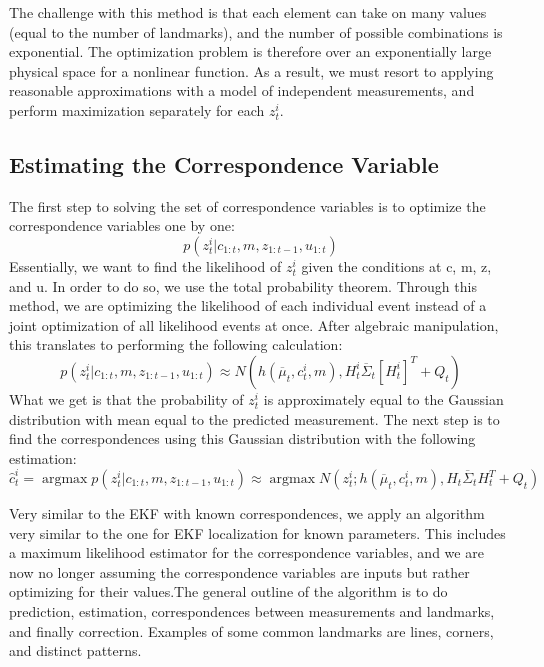 \documentclass[twoside]{article}
\begin{document}
The challenge with this method is that each element can take on many values (equal to the number of landmarks), and the number of possible combinations is exponential. The optimization problem is therefore
over an exponentially large physical space for a nonlinear function. As a result, we must resort to applying reasonable approximations with a model of independent measurements, and perform maximization
separately for each $z_t^i$.
\subsection{Estimating the Correspondence Variable}
The first step to solving the set of correspondence variables is to optimize the correspondence variables one by one:
\begin{equation}
    p \left( z _ { t } ^ { i } | c _ { 1 : t } , m , z _ { 1 : t - 1 } , u _ { 1 : t } \right)
\end{equation}
Essentially, we want to find the likelihood of $z_t^i$ given the conditions at c, m, z, and u. In order to do so, we use the total probability theorem. Through this method, we are optimizing the likelihood of each individual event instead of a joint optimization of all likelihood events at once. After algebraic manipulation, this translates to performing the following calculation:
\begin{equation}
p \left( z _ { t } ^ { i } | c _ { 1 : t } , m , z _ { 1 : t - 1 } , u _ { 1 : t } \right) \approx N \left( h \left( \overline { \mu } _ { t } , c _ { t } ^ { i } , m \right) , H _ { t } ^ { i } \overline { \Sigma } _ { t } \left[ H _ { t } ^ { i } \right] ^ { T } + Q _ { t } \right)
\end{equation}
What we get is that the probability of $z_t^i$ is approximately equal to the Gaussian distribution with mean equal to the predicted measurement. The next step is to find the correspondences using this Gaussian distribution with the following estimation:
\begin{equation}
\hat { c } _ { t } ^ { i } = \operatorname { argmax } p \left( z _ { t } ^ { i } | c _ { 1 : t } , m , z _ { 1 : t - 1 } , u _ { 1 : t } \right) \approx \operatorname { argmax } N \left( z _ { t } ^ { i } ; h \left( \overline { \mu } _ { t } , c _ { t } ^ { i } , m \right) , H _ { t } \overline { \Sigma } _ { t } H _ { t } ^ { T } + Q _ { t } \right)
\end{equation}

Very similar to the EKF with known correspondences, we apply an algorithm very similar to the one for EKF localization for known parameters. This includes a maximum likelihood estimator for the correspondence variables, and we are now no longer assuming the correspondence variables are inputs but rather optimizing for their values.The general outline of the algorithm is to do prediction, estimation, correspondences between measurements and landmarks, and finally correction. Examples of some common landmarks are lines, corners, and distinct patterns.
\end{document}
